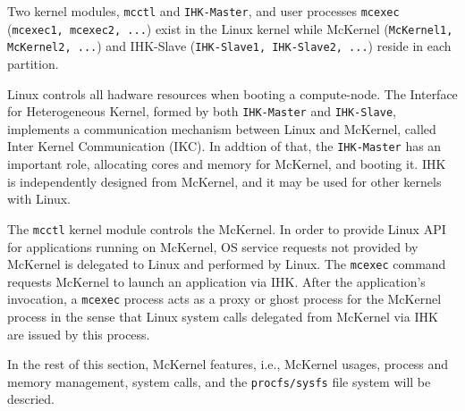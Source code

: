 \documentclass[twoside,11pt,fleqn]{book}
\begin{document}
Two kernel modules,
\texttt{mcctl} and \texttt{IHK-Master}, and user processes
\texttt{mcexec} (\texttt{mcexec1, mcexec2, ...})
exist in the Linux kernel while
McKernel (\texttt{McKernel1, McKernel2, ...}) and 
IHK-Slave (\texttt{IHK-Slave1, IHK-Slave2, ...}) reside
in each partition.

Linux controls all hadware resources when booting a compute-node.
The Interface for Heterogeneous Kernel, formed by both \texttt{IHK-Master}
and \texttt{IHK-Slave}, implements a communication mechanism between
Linux and McKernel, called Inter Kernel Communication (IKC).
In addtion of that, the \texttt{IHK-Master} has an important role,
allocating cores and memory for McKernel, and booting it.
IHK is independently designed from McKernel, and it may be used for other
kernels with Linux.

The \texttt{mcctl} kernel module controls the McKernel.
In order to provide Linux API for applications running on McKernel,
OS service requests not provided by McKernel is delegated to Linux and
performed by Linux.
The \texttt{mcexec} command requests McKernel to launch an application
via IHK.
After the application's invocation,
a \texttt{mcexec} process acts as a proxy or ghost process for the
McKernel process in the sense that Linux system calls delegated
from McKernel via IHK are issued by this process.

In the rest of this section, 
McKernel features, i.e., McKernel usages, process and memory management,
system calls, and the \texttt{procfs/sysfs} file system will be descried.
\end{document}
